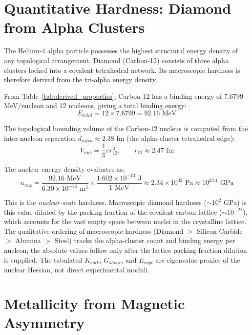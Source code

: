 \section{Quantitative Hardness: Diamond from Alpha Clusters}

The Helium-4 alpha particle possesses the highest structural energy density of any topological arrangement. Diamond (Carbon-12) consists of three alpha clusters locked into a covalent tetrahedral network. Its macroscopic hardness is therefore derived from the tri-alpha energy density.

From Table~\ref{tab:derived_properties}, Carbon-12 has a binding energy of $7.6799$ MeV/nucleon and 12 nucleons, giving a total binding energy:
\begin{equation}
    E_{total} = 12 \times 7.6799 = 92.16 \text{ MeV}
\end{equation}

The topological bounding volume of the Carbon-12 nucleus is computed from the inter-nucleon separation $d_{intra} \approx 2.38$ fm (the alpha-cluster tetrahedral edge):
\begin{equation}
    V_{nuc} = \frac{4}{3}\pi r_{12}^3, \qquad r_{12} \approx 2.47 \text{ fm}
\end{equation}

The nuclear energy density evaluates as:
\begin{equation}
    u_{nuc} = \frac{92.16 \text{ MeV}}{6.30 \times 10^{-44} \text{ m}^3} \times \frac{1.602 \times 10^{-13} \text{ J}}{1 \text{ MeV}} \approx 2.34 \times 10^{32} \text{ Pa} \approx 10^{23.4} \text{ GPa}
\end{equation}

This is the \textit{nuclear-scale} hardness. Macroscopic diamond hardness ($\sim 10^2$ GPa) is this value diluted by the packing fraction of the covalent carbon lattice ($\sim 10^{-21}$), which accounts for the vast empty space between nuclei in the crystalline lattice. The qualitative ordering of macroscopic hardness (Diamond $>$ Silicon Carbide $>$ Alumina $>$ Steel) tracks the alpha-cluster count and binding energy per nucleon; the absolute values follow only after the lattice packing-fraction dilution is supplied. The tabulated $K_{bulk}$, $G_{shear}$, and $E_{rupt}$ are eigenvalue proxies of the nuclear Hessian, not direct experimental moduli.

\section{Metallicity from Magnetic Asymmetry}


